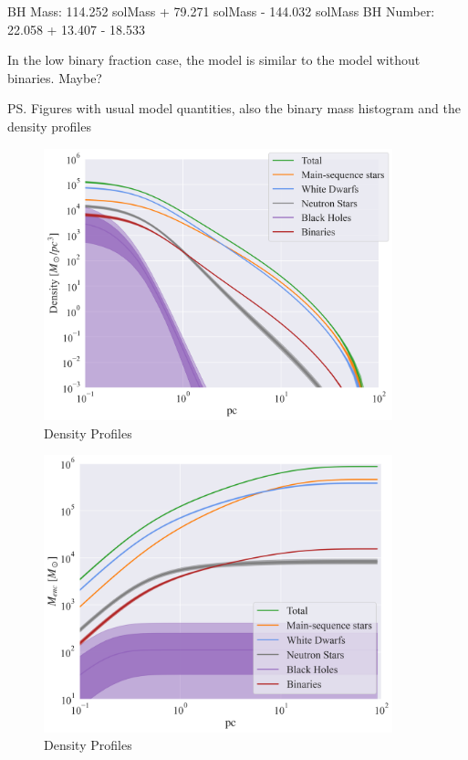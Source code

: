 BH Mass: 114.252 solMass + 79.271 solMass - 144.032 solMass
BH Number: 22.058 + 13.407 - 18.533




In the low binary fraction case, the model is similar to the model without binaries. Maybe?

\ps{Figures with usual model quantities, also the binary mass histogram and the density profiles}


\begin{figure}
	\begin{center}
\includegraphics[width=0.9\textwidth]{figures/low_bin_model/density.png}
	\end{center}
\caption{Density Profiles}
	\label{fig:low_bin_model_densities}
\end{figure}

\begin{figure}
	\begin{center}
		\includegraphics[width=0.9\textwidth]{figures/low_bin_model/mass_enc.png}
	\end{center}
	\caption{Density Profiles}
	\label{fig:low_bin_model_enclosed_mass}
\end{figure}

